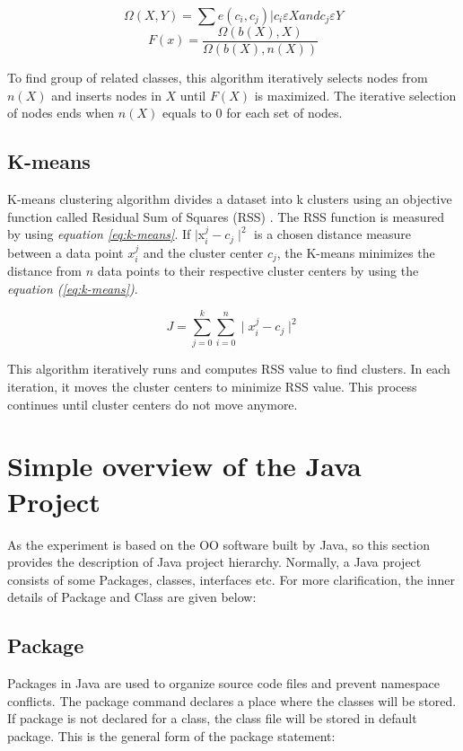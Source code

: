 \documentclass[12pt]{report}
\begin{document}
\begin{equation}
\label{eq:function}
\Omega(X,Y)=\sum e(c_{i},c_{j})| c_{i} \varepsilon X and c_{j} \varepsilon Y
\end{equation}
\begin{equation}
\label{eq:ration}
 F(x)=\frac{\Omega(b(X),X)}{\Omega(b(X),n(X))}
\end{equation}
 
To find group of related classes, this algorithm iteratively selects nodes from $n(X)$ and inserts  nodes in $X$ until $F(X)$ is maximized. The iterative selection of nodes ends when $n(X)$ equals to $0$ for each set of nodes.

\subsection{K-means}
K-means clustering algorithm divides a dataset into k clusters using an objective function called Residual Sum of Squares (RSS) \cite{July2014Online}. The RSS function is measured by using \emph{equation \ref{eq:k-means}}. If $\mid $x$_{i}^j-c_{j}\mid^2$ is a chosen distance measure between a data point $x_{i}^j$ and the cluster center $c_{j}$, the K-means minimizes the distance from $n$ data points to their respective cluster centers by using the \emph{equation (\ref{eq:k-means})}. 

\begin{equation}
\label{eq:k-means}
J=\sum\limits_{j=0}^k\sum \limits_{i=0}^n \mid x_{i}^j-c_{j}\mid^2
\end{equation}

This algorithm iteratively runs and computes RSS value to find clusters. In each iteration, it moves the cluster centers to minimize RSS value. This process continues until cluster centers do not move anymore.

\section{Simple overview of the Java Project}
As the experiment is based on the OO software built by Java, so this section provides the description of Java project hierarchy. Normally, a Java project consists of some Packages, classes, interfaces etc. For more clarification, the inner details of Package and Class are given below: 
 
\subsection{Package}
Packages in Java are used to organize source code files and prevent namespace conflicts.
The package command declares a place where the classes will be stored. If package is not declared for a class, the class file will be stored in default package. This is the general form of the package statement:
\end{document}
